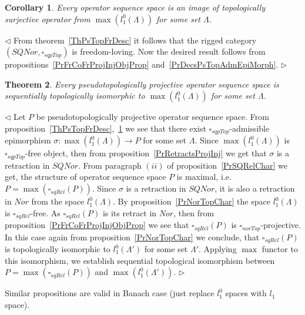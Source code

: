 \documentclass[12pt]{article}
\newtheorem{theorem}{Theorem}[subsection]
\newtheorem{corollary}[theorem]{Corollary}
\newenvironment{proof}{\par $\triangleleft$}{$\triangleright$}
\begin{document}
\begin{corollary}\label{CorSQSpaceIsImgPsTopAdmEpiMorph}
Every operator sequence space is an image of topologically surjective 
operator from $\max(l_1^0(\Lambda))$ for some set $\Lambda$.
\end{corollary}
\begin{proof}	
From theorem~\ref{ThPsTopFrDesc} it follows that the rigged 
category $(SQNor,\square_{sqpTop})$ is freedom-loving. Now the desired 
result follows from propositions~\ref{PrFrCoFrProjInjObjProp} 
and~\ref{PrDecsPsTopAdmEpiMorph}.
\end{proof}

\begin{theorem}\label{ThPsTopProjDesc}
Every pseudotopologically projective operator sequence space is sequentially 
topologically isomorphic to  $\max(l_1^0(\Lambda))$ for some set $\Lambda$.
\end{theorem}
\begin{proof}
Let $P$ be pseudotopologically projective operator sequence space. 
From proposition~\ref{ThPsTopFrDesc},~\ref{CorSQSpaceIsImgPsTopAdmEpiMorph} we 
see that there exist $\square_{sqpTop}$-admissible 
epimorphism $\sigma:\max(l_1^0(\Lambda))\to P$ for some set $\Lambda$. 
Since $\max(l_1^0(\Lambda))$ is  $\square_{sqpTop}$-free object, then from 
proposition~\ref{PrRetractsProjInj} we get that $\sigma$ is a  retraction 
in $SQNor$. From paragraph $(ii)$ of proposition~\ref{PrSQRelChar} we get, the 
structure of operator sequence space $P$ is maximal, 
i.e. $P=\max(\square_{sqRel}(P))$. Since $\sigma$ is a retraction in $SQNor$, 
it is also a retraction in $Nor$ from the space $l_1^0(\Lambda)$. 
By proposition~\ref{PrNorTopChar} the space $l_1^0(\Lambda)$ 
is $\square_{sqRel}$-free. As $\square_{sqRel}(P)$ is its retract in $Nor$, 
then from proposition~\ref{PrFrCoFrProjInjObjProp} we 
see that $\square_{sqRel}(P)$ is  $\square_{norTop}$-projective. In this case 
again from proposition~\ref{PrNorTopChar} we conclude, 
that $\square_{sqRel}(P)$ is topologically isomorphic to $l_1^0(\Lambda')$ 
for some set $\Lambda'$. Applying $\max$ functor to this isomorphism, 
we establish sequential topological isomorphism 
between  $P=\max(\square_{sqRel}(P))$ and $\max(l_1^0(\Lambda'))$.
\end{proof}

Similar propositions are valid in Banach case 
(just replace $l_1^0$ spaces with $l_1$ space).
\end{document}
